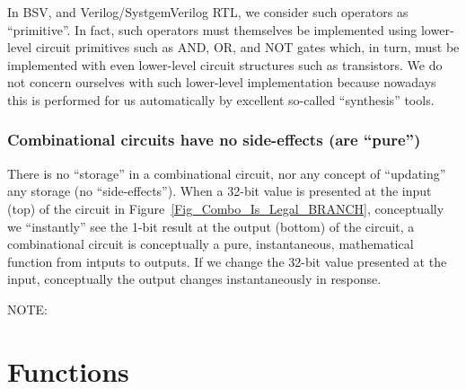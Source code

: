 In BSV, and Verilog/SystgemVerilog RTL, we consider such operators as
``primitive''.  In fact, such operators must themselves be implemented
using lower-level circuit primitives such as AND, OR, and NOT gates
which, in turn, must be implemented with even lower-level circuit
structures such as transistors.  We do not concern ourselves with such
lower-level implementation because nowadays this is performed for us
automatically by excellent so-called ``synthesis'' tools.


\subsubsection{Combinational circuits have no side-effects (are ``pure'')}


There is no ``storage'' in a combinational circuit, nor any concept of
``updating'' any storage (no ``side-effects'').  When a 32-bit value
is presented at the input (top) of the circuit in
Figure~\ref{Fig_Combo_Is_Legal_BRANCH}, conceptually we
``instantly'' see the 1-bit result at the output (bottom) of the
circuit, {\ie} a combinational circuit is conceptually a pure,
instantaneous, mathematical function from intputs to outputs.  If we
change the 32-bit value presented at the input, conceptually the
output changes instantaneously in response.



NOTE: 



\section{Functions}

